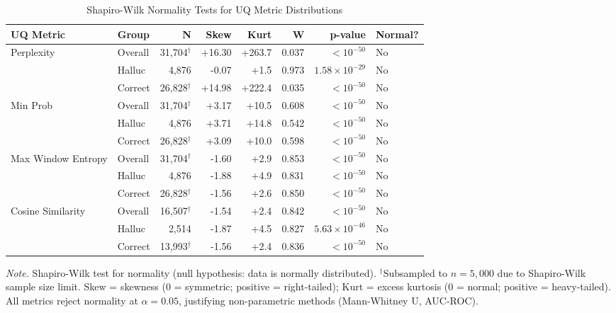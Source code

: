 \begin{table}[H]
\centering
\caption{Shapiro-Wilk Normality Tests for UQ Metric Distributions}
\label{tab:rq2_normality_tests}
\begin{threeparttable}
\begin{tabular}{llrrrrrl}
\toprule
\textbf{UQ Metric} & \textbf{Group} & \textbf{N} & \textbf{Skew} & \textbf{Kurt} & \textbf{W} & \textbf{p-value} & \textbf{Normal?} \\
\midrule
Perplexity & Overall & 31,704$^\dagger$ & +16.30 & +263.7 & 0.037 & $<10^{-50}$ & No \\
 & Halluc & 4,876 & -0.07 & +1.5 & 0.973 & $1.58\times 10^{-29}$ & No \\
 & Correct & 26,828$^\dagger$ & +14.98 & +222.4 & 0.035 & $<10^{-50}$ & No \\
\midrule
Min Prob & Overall & 31,704$^\dagger$ & +3.17 & +10.5 & 0.608 & $<10^{-50}$ & No \\
 & Halluc & 4,876 & +3.71 & +14.8 & 0.542 & $<10^{-50}$ & No \\
 & Correct & 26,828$^\dagger$ & +3.09 & +10.0 & 0.598 & $<10^{-50}$ & No \\
\midrule
Max Window Entropy & Overall & 31,704$^\dagger$ & -1.60 & +2.9 & 0.853 & $<10^{-50}$ & No \\
 & Halluc & 4,876 & -1.88 & +4.9 & 0.831 & $<10^{-50}$ & No \\
 & Correct & 26,828$^\dagger$ & -1.56 & +2.6 & 0.850 & $<10^{-50}$ & No \\
\midrule
Cosine Similarity & Overall & 16,507$^\dagger$ & -1.54 & +2.4 & 0.842 & $<10^{-50}$ & No \\
 & Halluc & 2,514 & -1.87 & +4.5 & 0.827 & $5.63\times 10^{-46}$ & No \\
 & Correct & 13,993$^\dagger$ & -1.56 & +2.4 & 0.836 & $<10^{-50}$ & No \\
\bottomrule
\end{tabular}
\begin{tablenotes}
\small
\item \textit{Note.} Shapiro-Wilk test for normality (null hypothesis: data is normally distributed). 
$^\dagger$Subsampled to $n=5{,}000$ due to Shapiro-Wilk sample size limit.
Skew = skewness (0 = symmetric; positive = right-tailed); Kurt = excess kurtosis (0 = normal; positive = heavy-tailed).
All metrics reject normality at $\alpha = 0.05$, justifying non-parametric methods (Mann-Whitney U, AUC-ROC).
\end{tablenotes}
\end{threeparttable}
\end{table}
